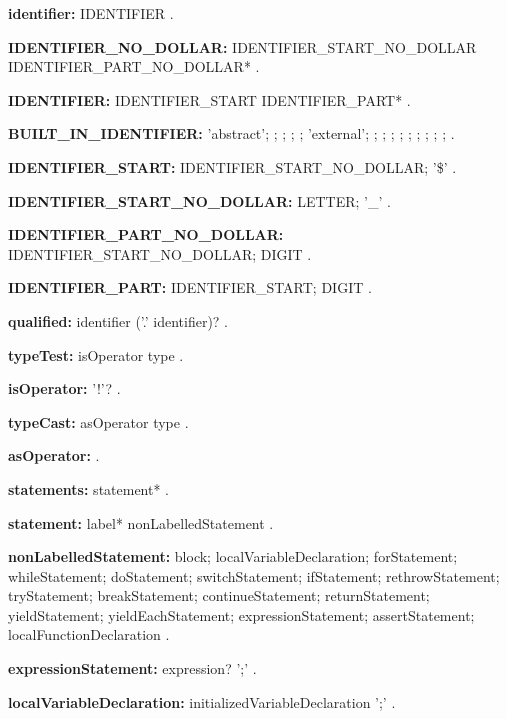 \begin{grammar}
{\bf identifier:}
    IDENTIFIER
    .

{\bf IDENTIFIER_NO_DOLLAR:}
    IDENTIFIER_START_NO_DOLLAR IDENTIFIER_PART_NO_DOLLAR*
    .

{\bf IDENTIFIER:}
    IDENTIFIER_START IDENTIFIER_PART*
    .

{\bf BUILT_IN_IDENTIFIER:}
    'abstract';
    \AS{};
    \DEFERRED{};
    \DYNAMIC{};
    \EXPORT{};
    'external';
    \FACTORY{};
    \GET{};
    \IMPLEMENTS{};
    \IMPORT{};
    \LIBRARY{};
    \OPERATOR{};
    \PART{};
    \SET{};
    \STATIC{};
    \TYPEDEF{}
    .

{\bf IDENTIFIER_START:}
    IDENTIFIER_START_NO_DOLLAR;
    '\$'
    .

{\bf IDENTIFIER_START_NO_DOLLAR:}
    LETTER;
    '_'
    .

{\bf  IDENTIFIER_PART_NO_DOLLAR:}
    IDENTIFIER_START_NO_DOLLAR;
    DIGIT
    .

{\bf IDENTIFIER_PART:}
    IDENTIFIER_START;
    DIGIT
    .

{\bf qualified:}
    identifier ('.' identifier)?  
    . 
\end{grammar}
\begin{grammar}
{\bf typeTest:}
    isOperator type
    .

{\bf isOperator:}
    \IS{} '!'?
    .
\end{grammar}
\begin{grammar}
{\bf typeCast:}
    asOperator type
    .

{\bf asOperator:}
    \AS{}
    .
\end{grammar}
\begin{grammar}
{\bf statements:}
    statement*
    .

{\bf statement:}
    label* nonLabelledStatement
    .

{\bf nonLabelledStatement:}
    block; 
    localVariableDeclaration;
    forStatement;
    whileStatement;
    doStatement;
    switchStatement;
    ifStatement;
    rethrowStatement;
    tryStatement;
    breakStatement;
    continueStatement;
    returnStatement;
    yieldStatement;
    yieldEachStatement;
    expressionStatement;
    assertStatement;
    localFunctionDeclaration
    .
\end{grammar}
\begin{grammar}
{\bf expressionStatement:}
    expression? ';'
    .
\end{grammar}
\begin{grammar}
{\bf localVariableDeclaration:}
    initializedVariableDeclaration ';'
    .
\end{grammar}
